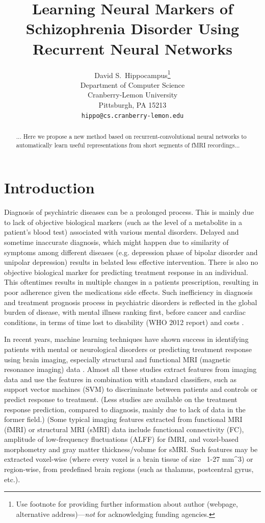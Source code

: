 \documentclass{article}
\title{Learning Neural Markers of Schizophrenia Disorder Using Recurrent Neural Networks}
\author{
  David S.~Hippocampus\thanks{Use footnote for providing further
    information about author (webpage, alternative
    address)---\emph{not} for acknowledging funding agencies.} \\
  Department of Computer Science\\
  Cranberry-Lemon University\\
  Pittsburgh, PA 15213 \\
  \texttt{hippo@cs.cranberry-lemon.edu} \\
}
\begin{document}

\maketitle

\begin{abstract}

... Here we propose a new method based on recurrent-convolutional neural networks to automatically learn useful representations from short segments of fMRI recordings...

\end{abstract}

\section{Introduction}

Diagnosis of psychiatric diseases can be a prolonged process. This is mainly due to lack of objective biological markers (such as the level of a metabolite in a patient's blood test) associated with various mental disorders. Delayed and sometime inaccurate diagnosis, which might happen due to similarity of symptoms among different diseases (e.g. depression phase of bipolar disorder and unipolar depression) results in belated less effective intervention. There is also no objective biological marker for predicting treatment response in an individual. This oftentimes results in multiple changes in a patients prescription, resulting in poor adherence given the medications side effects. Such inefficiency in diagnosis and treatment prognosis process in psychiatric disorders is reflected in the global burden of disease, with mental illness ranking first, before cancer and cardiac conditions, in terms of time lost to disability (WHO 2012 report) and costs \citep{Roehrig2016}.

In recent years, machine learning techniques have shown success in identifying patients with mental or neurological disorders or predicting treatment response using brain imaging, especially structural and functional MRI (magnetic resonance imaging) data \citep{Orru2012, Zarogianni2013, Koutsouleris2016, Vieira2017, Gheiratmand2017}. Almost all these studies extract features from imaging data and use the features in combination with standard classifiers, such as support vector machines (SVM) \citep{Orru2012, Wolfers2015} to discriminate between patients and controls or predict response to treatment. (Less studies are available on the treatment response prediction, compared to diagnosis, mainly due to lack of data in the former field.) (Some typical imaging features extracted from functional MRI (fMRI) or structural MRI (sMRI) data include functional connectivity (FC), amplitude of low-frequency fluctuations (ALFF) for fMRI, and voxel-based morphometry and gray matter thickness/volume for sMRI. Such features may be extracted voxel-wise (where every voxel is a brain tissue of size ~1-27 mm^3) or region-wise, from predefined brain regions (such as thalamus, postcentral gyrus, etc.).
\end{document}
